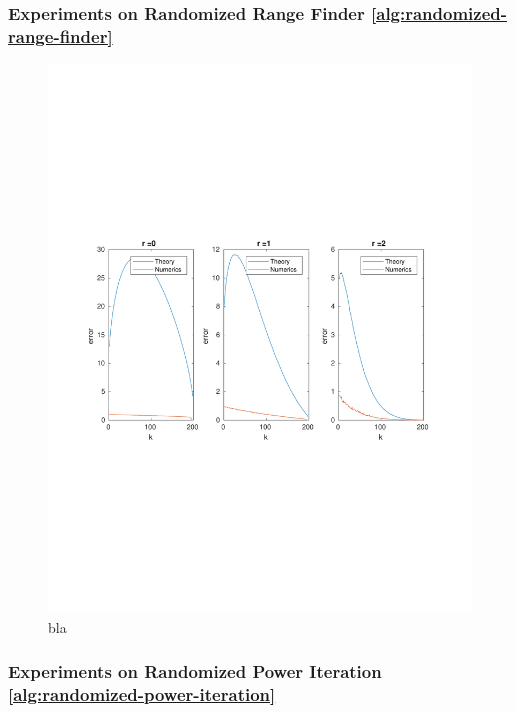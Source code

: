 \subsubsection{Experiments on Randomized Range Finder 
\ref{alg:randomized-range-finder}}

\begin{figure}[ht]
\begin{center}
\includegraphics[width=\textwidth]{figures/1-4.pdf}
\end{center}
\caption{bla}
\end{figure}

\subsubsection{Experiments on Randomized Power Iteration 
\ref{alg:randomized-power-iteration}}

